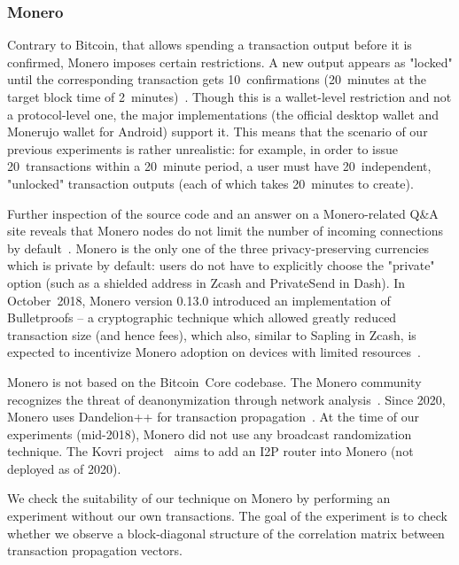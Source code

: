 \subsubsection{Monero}

Contrary to Bitcoin, that allows spending a transaction output before it is confirmed, Monero imposes certain restrictions.
A new output appears as "locked" until the corresponding transaction gets 10~confirmations (20~minutes at the target block time of 2~minutes)~\cite{dpzz2017}.
Though this is a wallet-level restriction and not a protocol-level one, the major implementations (the official desktop wallet and Monerujo wallet for Android) support it.
This means that the scenario of our previous experiments is rather unrealistic: for example, in order to issue 20~transactions within a 20~minute period, a user must have 20~independent, "unlocked" transaction outputs (each of which takes 20~minutes to create).

Further inspection of the source code and an answer on a Monero-related Q\&A site reveals that Monero nodes do not limit the number of incoming connections by default~\cite{user363032016}.
Monero is the only one of the three privacy-preserving currencies which is private by default: users do not have to explicitly choose the "private" option (such as a shielded address in Zcash and PrivateSend in Dash).
In October~2018, Monero version 0.13.0 introduced an implementation of Bulletproofs -- a cryptographic technique which allowed greatly reduced transaction size (and hence fees), which also, similar to Sapling in Zcash, is expected to incentivize Monero adoption on devices with limited resources~\cite{Spagni2018}.

Monero is not based on the Bitcoin~Core codebase.
The Monero community recognizes the threat of deanonymization through network analysis~\cite{user36432017, manontheinside2016, expez2016, Cameron2016}.
Since 2020, Monero uses Dandelion++ for transaction propagation~\cite{ErCiccione2020}.
At the time of our experiments (mid-2018), Monero did not use any broadcast randomization technique.
The Kovri project~\cite{Kovri} aims to add an I2P router into Monero (not deployed as of 2020).

We check the suitability of our technique on Monero by performing an experiment without our own transactions.
The goal of the experiment is to check whether we observe a block-diagonal structure of the correlation matrix between transaction propagation vectors.

